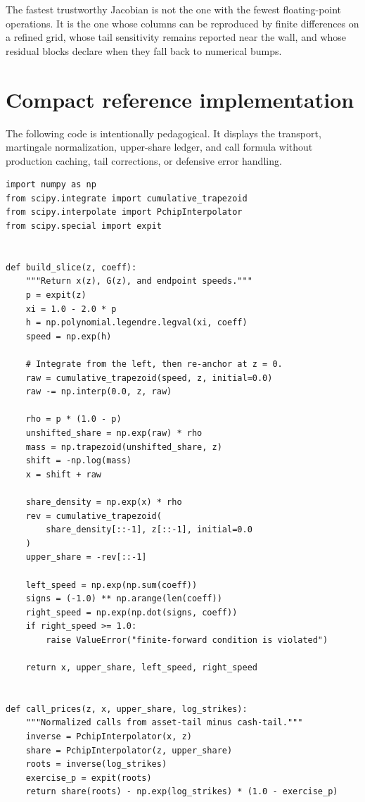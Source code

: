 \documentclass[11pt]{article}
\begin{document}
\begin{perfbox}
The fastest trustworthy Jacobian is not the one with the fewest floating-point
operations.  It is the one whose columns can be reproduced by finite
differences on a refined grid, whose tail sensitivity remains reported near
the wall, and whose residual blocks declare when they fall back to numerical
bumps.
\end{perfbox}

\section{Compact reference implementation}
\label{app:reference}

The following code is intentionally pedagogical.  It displays the transport,
martingale normalization, upper-share ledger, and call formula without
production caching, tail corrections, or defensive error handling.

\begin{lstlisting}[caption={A minimal percentile-ruler slice and call pricer.},
label={lst:reference}]
import numpy as np
from scipy.integrate import cumulative_trapezoid
from scipy.interpolate import PchipInterpolator
from scipy.special import expit


def build_slice(z, coeff):
    """Return x(z), G(z), and endpoint speeds."""
    p = expit(z)
    xi = 1.0 - 2.0 * p
    h = np.polynomial.legendre.legval(xi, coeff)
    speed = np.exp(h)

    # Integrate from the left, then re-anchor at z = 0.
    raw = cumulative_trapezoid(speed, z, initial=0.0)
    raw -= np.interp(0.0, z, raw)

    rho = p * (1.0 - p)
    unshifted_share = np.exp(raw) * rho
    mass = np.trapezoid(unshifted_share, z)
    shift = -np.log(mass)
    x = shift + raw

    share_density = np.exp(x) * rho
    rev = cumulative_trapezoid(
        share_density[::-1], z[::-1], initial=0.0
    )
    upper_share = -rev[::-1]

    left_speed = np.exp(np.sum(coeff))
    signs = (-1.0) ** np.arange(len(coeff))
    right_speed = np.exp(np.dot(signs, coeff))
    if right_speed >= 1.0:
        raise ValueError("finite-forward condition is violated")

    return x, upper_share, left_speed, right_speed


def call_prices(z, x, upper_share, log_strikes):
    """Normalized calls from asset-tail minus cash-tail."""
    inverse = PchipInterpolator(x, z)
    share = PchipInterpolator(z, upper_share)
    roots = inverse(log_strikes)
    exercise_p = expit(roots)
    return share(roots) - np.exp(log_strikes) * (1.0 - exercise_p)
\end{lstlisting}
\end{document}
